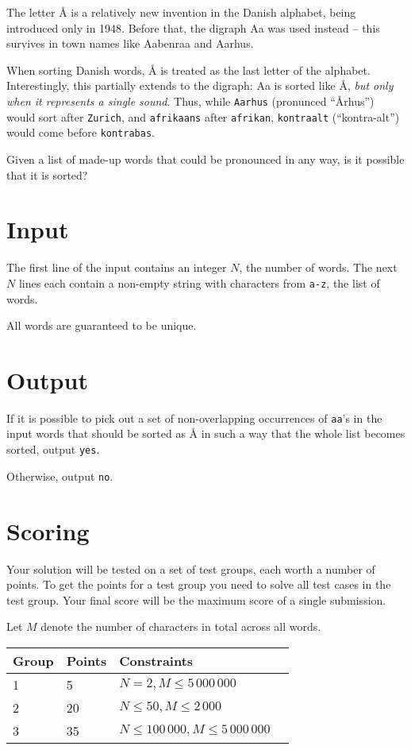 The letter Å is a relatively new invention in the Danish alphabet, being introduced only in 1948.
Before that, the digraph Aa was used instead -- this survives in town names like Aabenraa and Aarhus.

When sorting Danish words, Å is treated as the last letter of the alphabet.
Interestingly, this partially extends to the digraph: Aa is sorted like Å,
\emph{but only when it represents a single sound}.
Thus, while \texttt{Aarhus} (pronunced ``Århus'') would sort after \texttt{Zurich},
and \texttt{afrikaans} after \texttt{afrikan},
\texttt{kontraalt} (``kontra-alt'') would come before \texttt{kontrabas}.

Given a list of made-up words that could be pronounced in any way, is it possible that it is sorted?

\section*{Input}
The first line of the input contains an integer $N$, the number of words.
The next $N$ lines each contain a non-empty string with characters from \texttt{a-z}, the list of words.

All words are guaranteed to be unique.

\section*{Output}
If it is possible to pick out a set of non-overlapping occurrences of \texttt{aa}'s in the input words that
should be sorted as Å in such a way that the whole list becomes sorted, output \texttt{yes}.

Otherwise, output \texttt{no}.

\section*{Scoring}
Your solution will be tested on a set of test groups, each worth a number of points.
To get the points for a test group you need to solve all test cases in the test group.
Your final score will be the maximum score of a single submission.

Let $M$ denote the number of characters in total across all words.

\noindent
\begin{tabular}{| l | l | l | l |}
\hline
Group & Points & Constraints \\ \hline
1     & 5      & $N = 2, M \le 5\,000\,000$ \\ \hline
2     & 20     & $N \le 50, M \le 2\,000$ \\ \hline
3     & 35     & $N \le 100\,000, M \le 5\,000\,000$ \\ \hline
\end{tabular}

